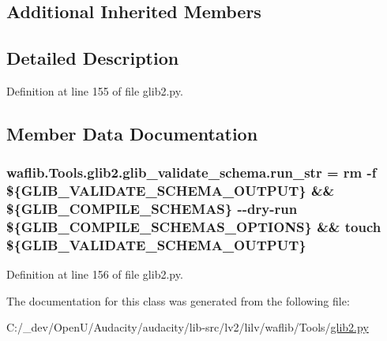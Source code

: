 \subsection*{Additional Inherited Members}


\subsection{Detailed Description}


Definition at line 155 of file glib2.\+py.



\subsection{Member Data Documentation}
\subsubsection[{\texorpdfstring{run\+\_\+str}{run_str}}]{ waflib.\+Tools.\+glib2.\+glib\+\_\+validate\+\_\+schema.\+run\+\_\+str = \textquotesingle{}rm -\/{\bf f} \$\{G\+L\+I\+B\+\_\+\+V\+A\+L\+I\+D\+A\+T\+E\+\_\+\+S\+C\+H\+E\+M\+A\+\_\+\+O\+U\+T\+P\+UT\} \&\& \$\{G\+L\+I\+B\+\_\+\+C\+O\+M\+P\+I\+L\+E\+\_\+\+S\+C\+H\+E\+M\+AS\} -\/-\/dry-\/{\bf run} \$\{G\+L\+I\+B\+\_\+\+C\+O\+M\+P\+I\+L\+E\+\_\+\+S\+C\+H\+E\+M\+A\+S\+\_\+\+O\+P\+T\+I\+O\+NS\} \&\& touch \$\{G\+L\+I\+B\+\_\+\+V\+A\+L\+I\+D\+A\+T\+E\+\_\+\+S\+C\+H\+E\+M\+A\+\_\+\+O\+U\+T\+P\+UT\}\textquotesingle{}\hspace{0.3cm}{\ttfamily [static]}}\hypertarget{classwaflib_1_1_tools_1_1glib2_1_1glib__validate__schema_acca7a7fdb13eca1a2fdc3251fc382749}{}\label{classwaflib_1_1_tools_1_1glib2_1_1glib__validate__schema_acca7a7fdb13eca1a2fdc3251fc382749}


Definition at line 156 of file glib2.\+py.



The documentation for this class was generated from the following file\+:\begin{DoxyCompactItemize}
\item 
C\+:/\+\_\+dev/\+Open\+U/\+Audacity/audacity/lib-\/src/lv2/lilv/waflib/\+Tools/\hyperlink{lilv_2waflib_2_tools_2glib2_8py}{glib2.\+py}\end{DoxyCompactItemize}

